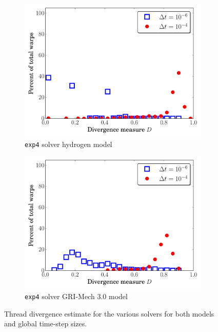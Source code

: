 \documentclass[preprint,review,11pt]{elsarticle}
\begin{document}
\begin{figure}[htbp]
\begin{subfigure}{0.49\textwidth}
      \includegraphics[width=\linewidth]{H2_exp4_div.pdf}
      \caption{\texttt{exp4} solver hydrogen model}
      \label{F:exp4_div_h2}
  \end{subfigure}
  \begin{subfigure}{0.49\textwidth}
      \includegraphics[width=\linewidth]{CH4_exp4_div.pdf}
      \caption{\texttt{exp4} solver GRI-Mech 3.0 model}
      \label{F:exp4_div_ch4}
  \end{subfigure}
  \caption{Thread divergence estimate for the various solvers for both models and global time-step sizes.}
  \label{F:divergence}
\end{figure}
\end{document}
